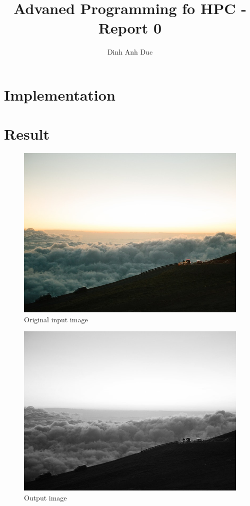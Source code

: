 \documentclass{article}
\title{Advaned Programming fo HPC - Report 0}
\author{Dinh Anh Duc}
\begin{document}
\maketitle

\section*{Implementation}
\section*{Result}
\begin{figure}[h]
\includegraphics[scale=0.7]{./labwork/data/cloud.jpeg}
\caption{Original input image}
\end{figure}
\begin{figure}[h]
\includegraphics[scale=0.7]{./labwork/build/labwork3-gpu-out.jpg}
\caption{Output image}
\end{figure}
\end{document}
